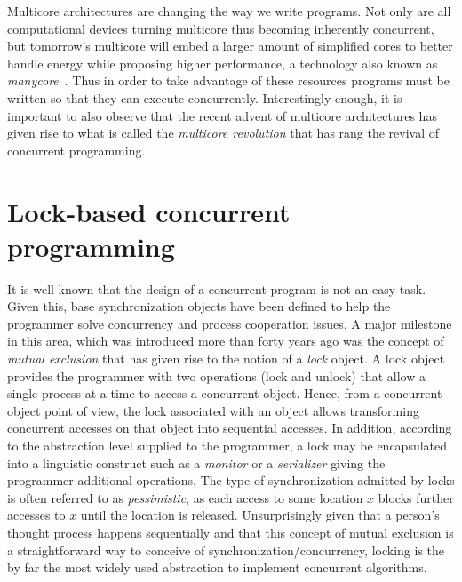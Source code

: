 







Multicore architectures are changing the way we write programs.
Not only are all computational devices
turning multicore thus becoming inherently concurrent, 
but tomorrow's multicore will embed a larger amount of simplified cores to better handle energy while 
proposing higher performance, a technology also known as \emph{manycore}~\cite{Borkar2007}.
Thus in order to take advantage of these resources programs must be written so
that they can execute concurrently.
Interestingly  enough,  
it is important to also observe that the recent advent of multicore 
architectures has  given rise to what is called the {\it multicore  
revolution} \cite{HL08} that has  rang the revival of concurrent programming. 


\section{Lock-based concurrent programming}
%
It is well known  that the design of a concurrent program is not an easy
task.
Given this, base synchronization objects have been defined to help 
the programmer solve  concurrency and process cooperation  issues. 
A  major milestone in this area, which was introduced 
more than forty years  ago was the concept of {\it mutual exclusion} \cite{D68}
that has given rise  to  the  notion of  a  {\it  lock} object.    
A lock object provides the programmer with two operations (lock and unlock)
that  allow a single process at a time to access a concurrent object. 
Hence, from a  concurrent object point of view,   the  lock associated with
an object allows transforming  concurrent  accesses on  that object  
into sequential accesses.
In addition, according to the abstraction level
supplied to the programmer,  a lock may be encapsulated into a linguistic 
construct such as a {\it monitor} \cite{H74} or a {\it serializer} \cite{HA79}
giving the programmer additional operations.
The type of synchronization admitted by locks is often referred to as \emph{pessimistic}, 
as each access to some location $x$ blocks further accesses to $x$ until the location is released.
Unsurprisingly given that
a person's thought process happens sequentially
and that this concept of mutual exclusion is a straightforward way to
conceive of synchronization/concurrency,
locking is the by far the most widely used abstraction to
implement concurrent algorithms.

